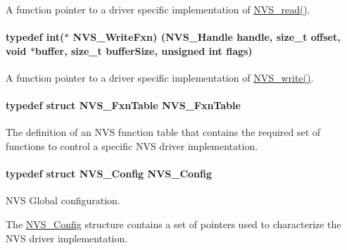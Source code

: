 A function pointer to a driver specific implementation of \hyperlink{_n_v_s_8h_ac966d3124df42478325b6a2f4def117b}{N\+V\+S\+\_\+read()}. 

\paragraph[{N\+V\+S\+\_\+\+Write\+Fxn}]{\setlength{\rightskip}{0pt plus 5cm}typedef int($\ast$ N\+V\+S\+\_\+\+Write\+Fxn) ({\bf N\+V\+S\+\_\+\+Handle} handle, size\+\_\+t offset, void $\ast$buffer, size\+\_\+t buffer\+Size, unsigned int flags)}\label{_n_v_s_8h_ad512db474e5833af4330fb57095c7fca}


A function pointer to a driver specific implementation of \hyperlink{_n_v_s_8h_a2c0acbdec0a65dc725019adb65ad282a}{N\+V\+S\+\_\+write()}. 

\paragraph[{N\+V\+S\+\_\+\+Fxn\+Table}]{\setlength{\rightskip}{0pt plus 5cm}typedef struct {\bf N\+V\+S\+\_\+\+Fxn\+Table}  {\bf N\+V\+S\+\_\+\+Fxn\+Table}}\label{_n_v_s_8h_a54257fb6f2f9762bcc8bb3d6ce27cde8}


The definition of an N\+V\+S function table that contains the required set of functions to control a specific N\+V\+S driver implementation. 

\paragraph[{N\+V\+S\+\_\+\+Config}]{\setlength{\rightskip}{0pt plus 5cm}typedef struct {\bf N\+V\+S\+\_\+\+Config}  {\bf N\+V\+S\+\_\+\+Config}}\label{_n_v_s_8h_ac19e1a4723b1faf8a7f419d2abf7e8e6}


N\+V\+S Global configuration. 

The \hyperlink{struct_n_v_s___config}{N\+V\+S\+\_\+\+Config} structure contains a set of pointers used to characterize the N\+V\+S driver implementation.

